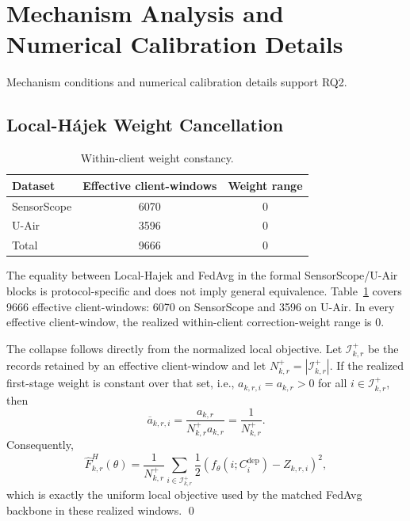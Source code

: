 \section{Mechanism Analysis and Numerical Calibration Details}
Mechanism conditions and numerical calibration details support RQ2.

\subsection{Local-H\'ajek Weight Cancellation}

\begin{table}[!htbp]
\centering
\caption{Within-client weight constancy.}
\label{tab:app_local_hajek}
\footnotesize
\setlength{\tabcolsep}{5pt}
\begin{tabular*}{\columnwidth}{@{\extracolsep{\fill}}lcc}
\toprule
Dataset & Effective client-windows & Weight range\\
\midrule
SensorScope & 6070 & $0$\\
U-Air & 3596 & $0$\\
\midrule
Total & 9666 & $0$\\
\bottomrule
\end{tabular*}
\end{table}


The equality between Local-Hajek and FedAvg in the formal SensorScope/U-Air
blocks is protocol-specific and does not imply general
equivalence. Table~\ref{tab:app_local_hajek} covers
9666 effective client-windows: 6070 on SensorScope and
3596 on U-Air. In every effective client-window, the realized
within-client correction-weight range is 0.



The collapse follows directly from the normalized local objective.  Let
$\mathcal I_{k,r}^{+}$ be the records retained by an effective client-window
and let $N_{k,r}^{+}=|\mathcal I_{k,r}^{+}|$.  If the realized first-stage
weight is constant over that set, i.e.,
$a_{k,r,i}=a_{k,r}>0$ for all $i\in\mathcal I_{k,r}^{+}$, then
\begin{equation}
 \overline a_{k,r,i}
 =
 \frac{a_{k,r}}
 {N_{k,r}^{+}a_{k,r}}
 =
 \frac{1}{N_{k,r}^{+}}.
 \label{eq:app_local_hajek_uniform}
\end{equation}
Consequently,
\begin{equation}
 \widehat F^H_{k,r}(\theta)
 =
 \frac{1}{N_{k,r}^{+}}
 \sum_{i\in\mathcal I_{k,r}^{+}}
 \frac{1}{2}
 \left(
 f_\theta(i;C_i^{\mathrm{dep}})-Z_{k,r,i}
 \right)^2,
 \label{eq:app_local_hajek_collapse}
\end{equation}
which is exactly the uniform local objective used by the matched FedAvg
backbone in these realized windows.
\qed

